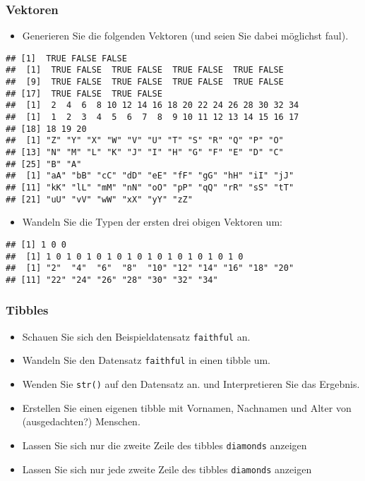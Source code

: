 \documentclass[11pt,german,a4paper]{article}
\providecommand{\tightlist}{%
  \setlength{\itemsep}{0pt}\setlength{\parskip}{0pt}}
\begin{document}
\hypertarget{vektoren-1}{%
\subsubsection{Vektoren}\label{vektoren-1}}

\begin{itemize}
\tightlist
\item
  Generieren Sie die folgenden Vektoren (und seien Sie dabei möglichst faul).
\end{itemize}

\begin{verbatim}
## [1]  TRUE FALSE FALSE
##  [1]  TRUE FALSE  TRUE FALSE  TRUE FALSE  TRUE FALSE
##  [9]  TRUE FALSE  TRUE FALSE  TRUE FALSE  TRUE FALSE
## [17]  TRUE FALSE  TRUE FALSE
##  [1]  2  4  6  8 10 12 14 16 18 20 22 24 26 28 30 32 34
##  [1]  1  2  3  4  5  6  7  8  9 10 11 12 13 14 15 16 17
## [18] 18 19 20
##  [1] "Z" "Y" "X" "W" "V" "U" "T" "S" "R" "Q" "P" "O"
## [13] "N" "M" "L" "K" "J" "I" "H" "G" "F" "E" "D" "C"
## [25] "B" "A"
##  [1] "aA" "bB" "cC" "dD" "eE" "fF" "gG" "hH" "iI" "jJ"
## [11] "kK" "lL" "mM" "nN" "oO" "pP" "qQ" "rR" "sS" "tT"
## [21] "uU" "vV" "wW" "xX" "yY" "zZ"
\end{verbatim}

\begin{itemize}
\tightlist
\item
  Wandeln Sie die Typen der ersten drei obigen Vektoren um:
\end{itemize}

\begin{verbatim}
## [1] 1 0 0
##  [1] 1 0 1 0 1 0 1 0 1 0 1 0 1 0 1 0 1 0 1 0
##  [1] "2"  "4"  "6"  "8"  "10" "12" "14" "16" "18" "20"
## [11] "22" "24" "26" "28" "30" "32" "34"
\end{verbatim}

\hypertarget{tibbles-1}{%
\subsubsection{Tibbles}\label{tibbles-1}}

\begin{itemize}
\tightlist
\item
  Schauen Sie sich den Beispieldatensatz \texttt{faithful} an.
\item
  Wandeln Sie den Datensatz \texttt{faithful} in einen tibble um.
\item
  Wenden Sie \texttt{str()} auf den Datensatz an. und Interpretieren Sie das Ergebnis.
\item
  Erstellen Sie einen eigenen tibble mit Vornamen, Nachnamen und Alter von (ausgedachten?) Menschen.
\item
  Lassen Sie sich nur die zweite Zeile des tibbles \texttt{diamonds} anzeigen
\item
  Lassen Sie sich nur jede zweite Zeile des tibbles \texttt{diamonds} anzeigen
\end{itemize}
\end{document}
